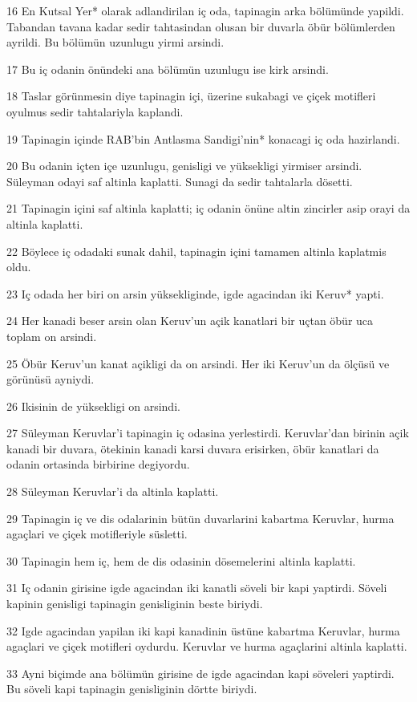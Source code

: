 \par 16 En Kutsal Yer* olarak adlandirilan iç oda, tapinagin arka bölümünde yapildi. Tabandan tavana kadar sedir tahtasindan olusan bir duvarla öbür bölümlerden ayrildi. Bu bölümün uzunlugu yirmi arsindi.
\par 17 Bu iç odanin önündeki ana bölümün uzunlugu ise kirk arsindi.
\par 18 Taslar görünmesin diye tapinagin içi, üzerine sukabagi ve çiçek motifleri oyulmus sedir tahtalariyla kaplandi.
\par 19 Tapinagin içinde RAB'bin Antlasma Sandigi'nin* konacagi iç oda hazirlandi.
\par 20 Bu odanin içten içe uzunlugu, genisligi ve yüksekligi yirmiser arsindi. Süleyman odayi saf altinla kaplatti. Sunagi da sedir tahtalarla dösetti.
\par 21 Tapinagin içini saf altinla kaplatti; iç odanin önüne altin zincirler asip orayi da altinla kaplatti.
\par 22 Böylece iç odadaki sunak dahil, tapinagin içini tamamen altinla kaplatmis oldu.
\par 23 Iç odada her biri on arsin yüksekliginde, igde agacindan iki Keruv* yapti.
\par 24 Her kanadi beser arsin olan Keruv'un açik kanatlari bir uçtan öbür uca toplam on arsindi.
\par 25 Öbür Keruv'un kanat açikligi da on arsindi. Her iki Keruv'un da ölçüsü ve görünüsü ayniydi.
\par 26 Ikisinin de yüksekligi on arsindi.
\par 27 Süleyman Keruvlar'i tapinagin iç odasina yerlestirdi. Keruvlar'dan birinin açik kanadi bir duvara, ötekinin kanadi karsi duvara erisirken, öbür kanatlari da odanin ortasinda birbirine degiyordu.
\par 28 Süleyman Keruvlar'i da altinla kaplatti.
\par 29 Tapinagin iç ve dis odalarinin bütün duvarlarini kabartma Keruvlar, hurma agaçlari ve çiçek motifleriyle süsletti.
\par 30 Tapinagin hem iç, hem de dis odasinin dösemelerini altinla kaplatti.
\par 31 Iç odanin girisine igde agacindan iki kanatli söveli bir kapi yaptirdi. Söveli kapinin genisligi tapinagin genisliginin beste biriydi.
\par 32 Igde agacindan yapilan iki kapi kanadinin üstüne kabartma Keruvlar, hurma agaçlari ve çiçek motifleri oydurdu. Keruvlar ve hurma agaçlarini altinla kaplatti.
\par 33 Ayni biçimde ana bölümün girisine de igde agacindan kapi söveleri yaptirdi. Bu söveli kapi tapinagin genisliginin dörtte biriydi.
